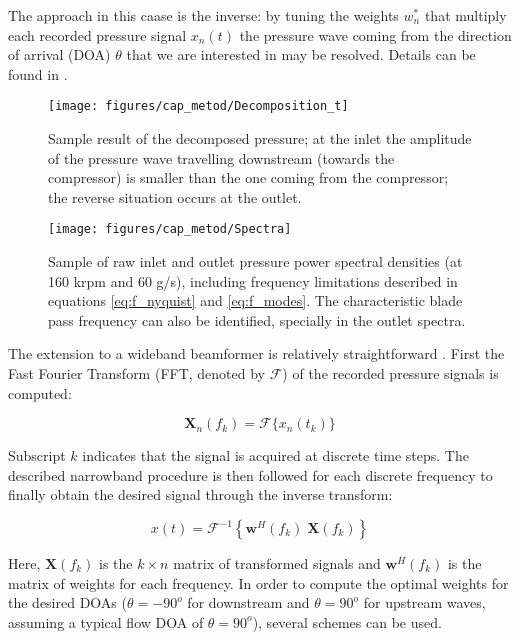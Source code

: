 The approach in this caase is the inverse: by tuning the weights $w_n^*$ that multiply each recorded pressure signal $x_n(t)$ the pressure wave coming from the direction of arrival (DOA) $\theta$ that we are interested in may be resolved. Details can be found in \cite{van1988beamforming}.

\begin{figure}[t!]
\centering
\texttt{[image: figures/cap\_metod/Decomposition\_t]}
\caption{Sample result of the decomposed pressure; at the inlet the amplitude of the pressure wave travelling downstream (towards the compressor) is smaller than the one coming from the compressor; the reverse situation occurs at the outlet.}
\label{fig:decomposition}
\end{figure}

\begin{figure}[t!]
\texttt{[image: figures/cap\_metod/Spectra]}
\caption{Sample of raw inlet and outlet pressure power spectral densities (at 160 krpm and 60 g/s), including frequency limitations described in equations \ref{eq:f_nyquist} and \ref{eq:f_modes}. The characteristic blade pass frequency can also be identified, specially in the outlet spectra.}
\label{fig:spectra}
\end{figure}

The extension to a wideband beamformer is relatively straightforward \cite{piper2011broadband}. First the Fast Fourier Transform (FFT, denoted by $\mathcal F$) of the recorded pressure signals is computed:

\begin{equation}
  \mathbf X_n(f_k)=\mathcal{F}\{x_n(t_k)\}
\end{equation}

Subscript $k$ indicates that the signal is acquired at discrete time steps. The described narrowband procedure is then followed for each discrete frequency to finally obtain the desired signal through the inverse transform:

\begin{equation}
    x(t)=\mathcal{F}^{-1}\left\{\mathbf w^H(f_k)\; \mathbf X(f_k)\right\}
\end{equation}

Here, $\mathbf X(f_k)$ is the $k \times n$ matrix of transformed signals and $\mathbf w^H(f_k)$ is the matrix of weights for each frequency. In order to compute the optimal weights for the desired DOAs ($\theta=-90^o$ for downstream and $\theta=90^o$ for upstream waves, assuming a typical flow DOA of $\theta=90^o$), several schemes can be used.

